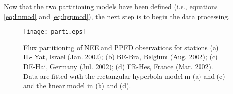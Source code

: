 Now that the two partitioning models have been defined (i.e., equations \ref{eq:linmod} and \ref{eq:hypmod}), the next step is to begin the data processing.  
\begin{figure}[h!]
    \texttt{[image: parti.eps]}
    \caption{Flux partitioning of NEE and PPFD observations for stations (a) IL-
    Yat, Israel (Jan. 2002); (b) BE-Bra, Belgium (Aug. 2002); (c) DE-Hai, 
    Germany (Jul. 2002); (d) FR-Hes, France (Mar. 2002).  Data are fitted with 
    the rectangular hyperbola model in (a) and (c) and the linear model in (b) 
    and (d). }
    \label{fig:parti}
\end{figure}

